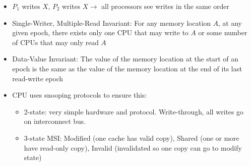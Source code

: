 \documentclass[landscape,10pt]{article}
\begin{document}
\begin{multicols}{2}
\begin{itemize}
\begin{itemize}
        \item[] \(P_1\) writes \(X\), \(P_2\) writes \(X \rightarrow\) all processors see writes in the same order
        \item[] Single-Writer, Multiple-Read Invariant: For any memory location \(A\), at any given epoch, there exists only one CPU that may write to \(A\) or some number of CPUs that may only read \(A\)
        \item[] Data-Value Invariant: The value of the memory location at the start of an epoch is the same as the value of the memory location at the end of its last read-write epoch
        \item[] CPU uses snooping protocols to ensure this:
        \begin{itemize}
            \item[] 2-state: very simple hardware and protocol. Write-through, all writes go on interconnect bus.
            \item[] 3-state MSI: Modified (one cache has valid copy), Shared (one or more have read-only copy), Invalid (invalidated so one copy can go to modify state)
        \end{itemize}

    \end{itemize}
\end{itemize}


    \end{multicols}
\end{document}
